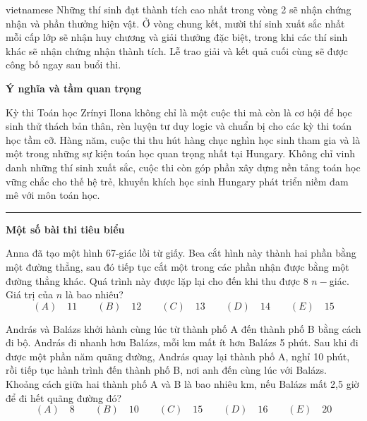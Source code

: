 \documentclass{article}
\begin{document}
\begin{otherlanguage*}{vietnamese}
Những thí sinh đạt thành tích cao nhất trong vòng 2 sẽ nhận chứng nhận và phần thưởng hiện vật.
Ở vòng chung kết, mười thí sinh xuất sắc nhất mỗi cấp lớp sẽ nhận huy chương và giải thưởng đặc biệt, trong khi các thí sinh khác sẽ nhận chứng nhận thành tích.
Lễ trao giải và kết quả cuối cùng sẽ được công bố ngay sau buổi thi.

\textbf{Ý nghĩa và tầm quan trọng}

Kỳ thi Toán học Zrínyi Ilona không chỉ là một cuộc thi mà còn là cơ hội để học sinh thử thách bản thân,
rèn luyện tư duy logic và chuẩn bị cho các kỳ thi toán học tầm cỡ.
Hàng năm, cuộc thi thu hút hàng chục nghìn học sinh tham gia và là một trong những sự kiện toán học quan trọng nhất tại Hungary.
Không chỉ vinh danh những thí sinh xuất sắc, cuộc thi còn góp phần xây dựng nền tảng toán học vững chắc cho thế hệ trẻ,
khuyến khích học sinh Hungary phát triển niềm đam mê với môn toán học.

\bigbreak

\noindent\rule{16.5cm}{0.4pt}

\textbf{Một số bài thi tiêu biểu}

\bigbreak

\begin{problem*}
    Anna đã tạo một hình 67-giác lồi từ giấy. Bea cắt hình này thành hai phần bằng một đường thẳng, sau đó tiếp tục cắt một trong các phần nhận được bằng một đường thẳng khác.
    Quá trình này được lặp lại cho đến khi thu được 8 $n-$giác. Giá trị của $n$ là bao nhiêu?
    \[
        (A) \quad 11 \qquad
        (B) \quad 12 \qquad
        (C) \quad 13 \qquad
        (D) \quad 14 \qquad
        (E) \quad 15
    \]
\end{problem*}

\begin{problem*}
    András và Balázs khởi hành cùng lúc từ thành phố A đến thành phố B bằng cách đi bộ. András đi nhanh hơn Balázs, mỗi km mất ít hơn Balázs 5 phút.
    Sau khi đi được một phần năm quãng đường, András quay lại thành phố A, nghỉ 10 phút, rồi tiếp tục hành trình đến thành phố B, nơi anh đến cùng lúc với Balázs.
    Khoảng cách giữa hai thành phố A và B là bao nhiêu km, nếu Balázs mất 2,5 giờ để đi hết quãng đường đó?
    \[
        (A) \quad 8 \qquad
        (B) \quad 10 \qquad
        (C) \quad 15 \qquad
        (D) \quad 16 \qquad
        (E) \quad 20
    \]
\end{problem*}


\end{otherlanguage*}
\end{document}
